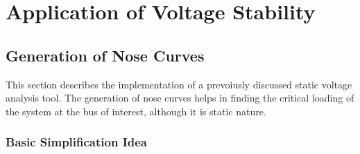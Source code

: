 \section{Application of Voltage Stability}
\label{sec:application-voltage-stability}


\subsection{Generation of Nose Curves}
\label{sec:nose-curves}

This section describes the implementation of a prevoiusly discussed static voltage analysis tool.
The generation of nose curves helps in finding the critical loading of the system at the bus of interest, although it is static nature. 

\subsubsection{Basic Simplification Idea}

